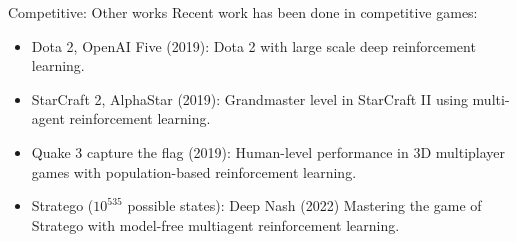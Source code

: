 \documentclass[9pt, hyperref={pdfusetitle,colorlinks=true,allcolors=DarkBlue}]{beamer}
\begin{document}

\begin{frame}{Competitive: Other works}
Recent work has been done in competitive games:
 \vfill
\begin{itemize}
    \item Dota 2, OpenAI Five (2019): Dota 2 with large scale deep reinforcement learning.
     \vfill
    \item StarCraft 2, AlphaStar (2019): Grandmaster level in StarCraft II using multi-agent reinforcement learning.
     \vfill
    \item Quake 3 capture the flag (2019): Human-level performance in 3D multiplayer games with population-based reinforcement learning.
     \vfill
     \item Stratego ($10^{535}$ possible states): Deep Nash (2022) Mastering the game of Stratego with model-free multiagent reinforcement learning.

     
\end{itemize}
\end{frame}
\end{document}
